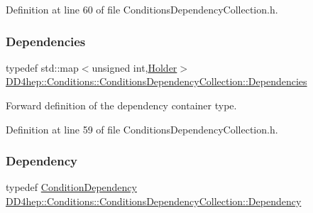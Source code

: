 Definition at line 60 of file Conditions\+Dependency\+Collection.\+h.

\hypertarget{class_d_d4hep_1_1_conditions_1_1_conditions_dependency_collection_a7fb4072b6036f59389b929e312e2679c}{}\label{class_d_d4hep_1_1_conditions_1_1_conditions_dependency_collection_a7fb4072b6036f59389b929e312e2679c} 
\subsubsection{\texorpdfstring{Dependencies}{Dependencies}}
{\footnotesize\ttfamily typedef std\+::map$<$unsigned int,\hyperlink{struct_d_d4hep_1_1_conditions_1_1_conditions_dependency_collection_1_1_holder}{Holder}$>$ \hyperlink{class_d_d4hep_1_1_conditions_1_1_conditions_dependency_collection_a7fb4072b6036f59389b929e312e2679c}{D\+D4hep\+::\+Conditions\+::\+Conditions\+Dependency\+Collection\+::\+Dependencies}}



Forward definition of the dependency container type. 



Definition at line 59 of file Conditions\+Dependency\+Collection.\+h.

\hypertarget{class_d_d4hep_1_1_conditions_1_1_conditions_dependency_collection_a87252585d3e17ae82813c039b1b47e8a}{}\label{class_d_d4hep_1_1_conditions_1_1_conditions_dependency_collection_a87252585d3e17ae82813c039b1b47e8a} 
\subsubsection{\texorpdfstring{Dependency}{Dependency}}
{\footnotesize\ttfamily typedef \hyperlink{class_d_d4hep_1_1_conditions_1_1_condition_dependency}{Condition\+Dependency} \hyperlink{class_d_d4hep_1_1_conditions_1_1_conditions_dependency_collection_a87252585d3e17ae82813c039b1b47e8a}{D\+D4hep\+::\+Conditions\+::\+Conditions\+Dependency\+Collection\+::\+Dependency}}



